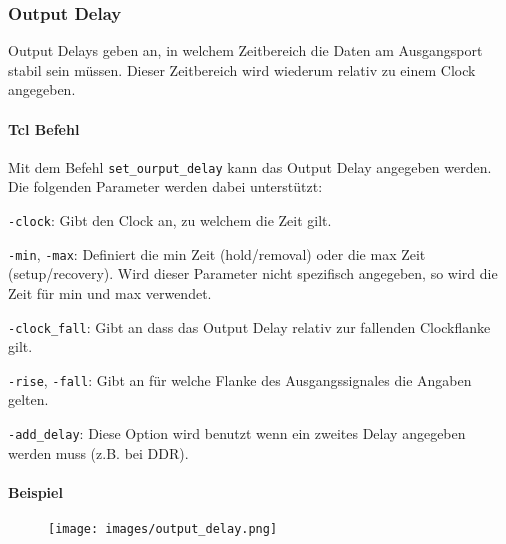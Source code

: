\subsubsection{Output Delay} \label{chapter:output_delay}
Output Delays geben an, in welchem Zeitbereich die Daten am Ausgangsport stabil sein müssen. Dieser Zeitbereich wird wiederum relativ zu einem Clock angegeben.

\paragraph{Tcl Befehl}
Mit dem Befehl \texttt{set\_ourput\_delay} kann das Output Delay angegeben werden. Die folgenden Parameter werden dabei unterstützt:
\begin{compactitem}
    \item \texttt{-clock}: Gibt den Clock an, zu welchem die Zeit gilt.
    \item \texttt{-min}, \texttt{-max}: Definiert die min Zeit (hold/removal) oder die max Zeit (setup/recovery). Wird dieser Parameter nicht spezifisch angegeben, so wird die Zeit für min und max verwendet.
    \item \texttt{-clock\_fall}: Gibt an dass das Output Delay relativ zur fallenden Clockflanke gilt.
    \item \texttt{-rise}, \texttt{-fall}: Gibt an für welche Flanke des Ausgangssignales die Angaben gelten.
    \item \texttt{-add\_delay}: Diese Option wird benutzt wenn ein zweites Delay angegeben werden muss (z.B. bei DDR).
\end{compactitem}

\paragraph{Beispiel}
\begin{figure}[H]
    \texttt{[image: images/output\_delay.png]}
\end{figure}

